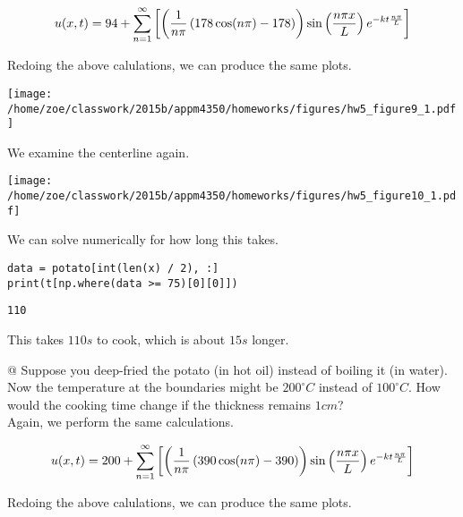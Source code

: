 \documentclass[10pt]{article}
\begin{document}
\begin{easylist}[enumerate]
    \begin{align*}
        u(x, t) = 94 + \sum_{n=1}^\infty \left[ \left( \frac{1}{n\pi} \left( 178 \cos(n\pi) - 178 \right) \right) \sin\left(\frac{n\pi x}{L}\right) e^{-kt\frac{n\pi}{L}}\right] 
    \end{align*}

    Redoing the above calulations, we can produce the same plots.

\simpleweave

\texttt{[image: /home/zoe/classwork/2015b/appm4350/homeworks/figures/hw5\_figure9\_1.pdf]}

\nosimpleweave

    We examine the centerline again.

\simpleweave

\texttt{[image: /home/zoe/classwork/2015b/appm4350/homeworks/figures/hw5\_figure10\_1.pdf]}

\nosimpleweave

    We can solve numerically for how long this takes.

\weave

\begin{verbatim}
data = potato[int(len(x) / 2), :]
print(t[np.where(data >= 75)[0][0]])
\end{verbatim}
\begin{verbatim}
110

\end{verbatim}

\noweave

    This takes $110s$ to cook, which is about $15s$ longer.

    @ Suppose you deep-fried the potato (in hot oil) instead of boiling it (in water). Now the temperature at the
    boundaries might be $200^\circ C$ instead of $100^\circ C$. How would the cooking time change if the thickness
    remains $1 cm$? \\

    Again, we perform the same calculations.

    \begin{align*}
        u(x, t) = 200 + \sum_{n=1}^\infty \left[ \left( \frac{1}{n\pi} \left( 390 \cos(n\pi) - 390 \right) \right) \sin\left(\frac{n\pi x}{L}\right) e^{-kt\frac{n\pi}{L}}\right] 
    \end{align*}

    Redoing the above calulations, we can produce the same plots.


\end{easylist}
\end{document}
